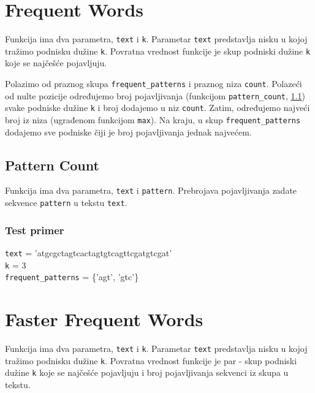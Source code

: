 \section{Frequent Words}

Funkcija ima dva parametra, \texttt{text} i \texttt{k}. Parametar \texttt{text} predstavlja nisku u kojoj tražimo podnisku dužine \texttt{k}. Povratna vrednost funkcije je skup podniski dužine \texttt{k} koje se najčešće pojavljuju.

Polazimo od praznog skupa \texttt{frequent\_patterns} i praznog niza \texttt{count}. Polazeći od nulte pozicije određujemo broj pojavljivanja (funkcijom \texttt{pattern\_count}, \ref{patternCount}) svake podniske dužine \texttt{k} i broj dodajemo u niz \texttt{count}. Zatim, određujemo najveći broj iz niza (ugrađenom funkcijom \texttt{max}). Na kraju, u skup \texttt{frequent\_patterns} dodajemo sve podniske čiji je broj pojavljivanja jednak najvećem.




\subsection{Pattern Count}
\label{patternCount}

Funkcija ima dva parametra, \texttt{text} i \texttt{pattern}. Prebrojava pojavljivanja zadate sekvence \texttt{pattern} u tekstu \texttt{text}. 



\subsubsection{Test primer}
\noindent\texttt{text} = 'atgcgctagtcactagtgtcagttcgatgtcgat'
\\\texttt{k} = 3
\\\texttt{frequent\_patterns} = \{'agt', 'gtc'\}


\section{Faster Frequent Words}

Funkcija ima dva parametra, \texttt{text} i \texttt{k}. Parametar \texttt{text} predstavlja nisku u kojoj tražimo podnisku dužine \texttt{k}. Povratna vrednost funkcije je par - skup podniski dužine \texttt{k} koje se najčešće pojavljuju i broj pojavljivanja sekvenci iz skupa u tekstu. 

